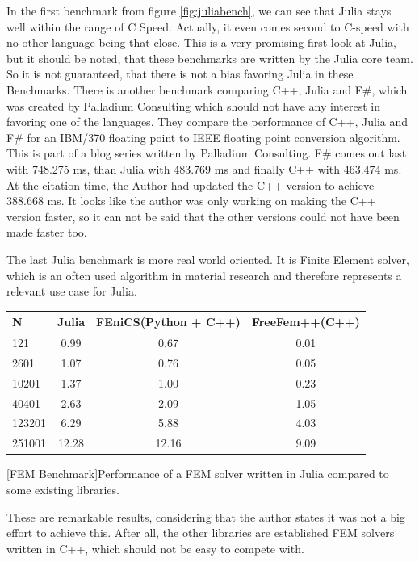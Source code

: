 In the first benchmark from figure \ref{fig:juliabench}, we can see that Julia stays well within the range of C Speed. 
Actually, it even comes second to C-speed with no other language being that close.
This is a very promising first look at Julia, but it should be noted, that these benchmarks are written by the Julia core team.
So it is not guaranteed, that there is not a bias favoring Julia in these Benchmarks.
There is another benchmark comparing C++, Julia and F\#, which was created by Palladium Consulting which should not have any interest in favoring one of the languages.
They compare the performance of C++, Julia and F\# for an IBM/370 floating point to IEEE floating point conversion algorithm. This is part of a blog series\cite{JuliaFSCpp} written by Palladium Consulting.
F\# comes out last with 748.275 ms, than Julia with 483.769 ms and finally C++ with 463.474 ms. 
At the citation time, the Author had updated the C++ version to achieve 388.668 ms. 
It looks like the author was only working on making the C++ version faster, so it can not be said that the other versions could not have been made faster too.


The last Julia benchmark is more real world oriented. 
It is Finite Element solver, which is an often used algorithm in material research and therefore represents a relevant use case for Julia.

\begin{table}[htbp]
    \centering
    \begin{tabular}{l|c|c|c}
        \hline
        \textbf{N}  & \textbf{Julia} & \textbf{FEniCS(Python + C++)}  & \textbf{FreeFem++(C++)}\\
        \hline
        121         & 0.99           & 0.67             & 0.01 \\
        2601        & 1.07           & 0.76             & 0.05 \\
        10201       & 1.37           & 1.00             & 0.23 \\
        40401       & 2.63           & 2.09             & 1.05 \\
        123201      & 6.29           & 5.88             & 4.03 \\
        251001      & 12.28          & 12.16            & 9.09 \\
        \hline
    \end{tabular}
    [FEM Benchmark]{Performance of a FEM solver written in Julia compared to some existing libraries. \cite{FMSolver}}
    \label{table:fembench}
\end{table}
These are remarkable results, considering that the author states it was not a big effort to achieve this. After all, the other libraries are established FEM solvers written in C++, which should not be easy to compete with.


